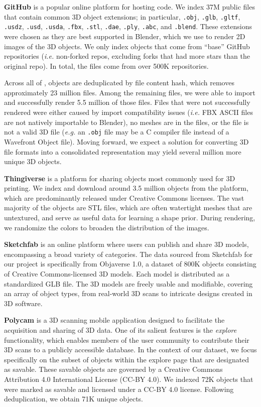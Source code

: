 \textbf{GitHub} is a popular online platform for hosting code. We index 37M public files that contain common 3D object extensions; in particular, \texttt{.obj}, \texttt{.glb}, \texttt{.gltf}, \texttt{.usdz}, \texttt{.usd}, \texttt{.usda}, \texttt{.fbx}, \texttt{.stl}, \texttt{.dae}, \texttt{.ply}, \texttt{.abc}, and \texttt{.blend}. These extensions were chosen as they are best supported in Blender, which we use to render 2D images of the 3D objects. We only index objects that come from ``base'' GitHub repositories (\textit{i.e.} non-forked repos, excluding forks that had more stars than the original repo). In total, the files come from over 500K repositories.

Across all of \dataset, objects are deduplicated by file content hash, which removes approximately 23 million files. Among the remaining files, we were able to import and successfully render 5.5 million of those files. Files that were not successfully rendered were either caused by import compatibility issues (\textit{i.e.} FBX ASCII files are not natively importable to Blender), no meshes are in the files, or the file is not a valid 3D file (\textit{e.g.} an \texttt{.obj} file may be a C compiler file instead of a Wavefront Object file). Moving forward, we expect a solution for converting 3D file formats into a consolidated representation may yield several million more unique 3D objects.

\textbf{Thingiverse} is a platform for sharing objects most commonly used for 3D printing. We index and download around 3.5 million objects from the platform, which are predominantly released under Creative Commons licenses. The vast majority of the objects are STL files, which are often watertight meshes that are untextured, and serve as useful data for learning a shape prior. During rendering, we randomize the colors to broaden the distribution of the images.

\textbf{Sketchfab} is an online platform where users can publish and share 3D models, encompassing a broad variety of categories. The data sourced from Sketchfab for our project is specifically from Objaverse 1.0, a dataset of 800K objects consisting of Creative Commons-licensed 3D models. Each model is distributed as a standardized GLB file. The 3D models are freely usable and modifiable, covering an array of object types, from real-world 3D scans to intricate designs created in 3D software.

\textbf{Polycam} is a 3D scanning mobile application designed to facilitate the acquisition and sharing of 3D data. One of its salient features is the \textit{explore} functionality, which enables members of the user community to contribute their 3D scans to a publicly accessible database. In the context of our dataset, we focus specifically on the subset of objects within the explore page that are designated as savable. These savable objects are governed by a Creative Commons Attribution 4.0 International License (CC-BY 4.0). We indexed 72K objects that were marked as savable and licensed under a CC-BY 4.0 license. Following deduplication, we obtain 71K unique objects.


